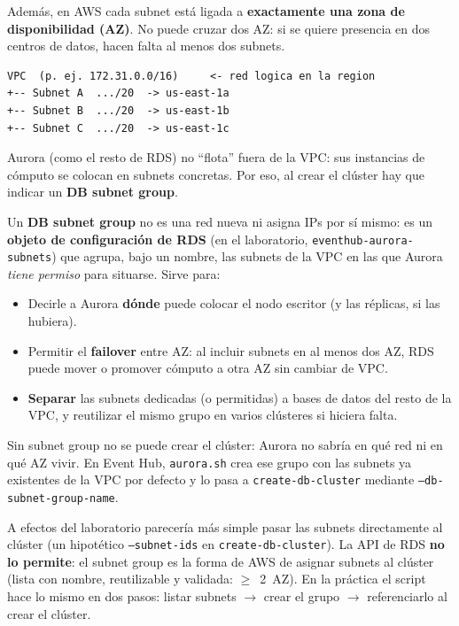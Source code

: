 \documentclass[12pt,a4paper]{article}
\begin{document}
Además, en AWS cada subnet está ligada a \textbf{exactamente una zona de disponibilidad (AZ)}. No puede cruzar dos AZ: si se quiere presencia en dos centros de datos, hacen falta al menos dos subnets.

\begin{verbatim}
VPC  (p. ej. 172.31.0.0/16)     <- red logica en la region
+-- Subnet A  .../20  -> us-east-1a
+-- Subnet B  .../20  -> us-east-1b
+-- Subnet C  .../20  -> us-east-1c
\end{verbatim}

Aurora (como el resto de RDS) no ``flota'' fuera de la VPC: sus instancias de cómputo se colocan en subnets concretas. Por eso, al crear el clúster hay que indicar un \textbf{DB subnet group}.

Un \textbf{DB subnet group} no es una red nueva ni asigna IPs por sí mismo: es un \textbf{objeto de configuración de RDS} (en el laboratorio, \texttt{eventhub-aurora-subnets}) que agrupa, bajo un nombre, las subnets de la VPC en las que Aurora \emph{tiene permiso} para situarse. Sirve para:

\begin{itemize}
    \item Decirle a Aurora \textbf{dónde} puede colocar el nodo escritor (y las réplicas, si las hubiera).
    \item Permitir el \textbf{failover} entre AZ: al incluir subnets en al menos dos AZ, RDS puede mover o promover cómputo a otra AZ sin cambiar de VPC.
    \item \textbf{Separar} las subnets dedicadas (o permitidas) a bases de datos del resto de la VPC, y reutilizar el mismo grupo en varios clústeres si hiciera falta.
\end{itemize}

Sin subnet group no se puede crear el clúster: Aurora no sabría en qué red ni en qué AZ vivir. En Event Hub, \texttt{aurora.sh} crea ese grupo con las subnets ya existentes de la VPC por defecto y lo pasa a \texttt{create-db-cluster} mediante \texttt{--db-subnet-group-name}.

A efectos del laboratorio parecería más simple pasar las subnets directamente al clúster (un hipotético \texttt{--subnet-ids} en \texttt{create-db-cluster}). La API de RDS \textbf{no lo permite}: el subnet group es la forma de AWS de asignar subnets al clúster (lista con nombre, reutilizable y validada: $\geq$~2~AZ). En la práctica el script hace lo mismo en dos pasos: listar subnets $\rightarrow$ crear el grupo $\rightarrow$ referenciarlo al crear el clúster.
\end{document}
